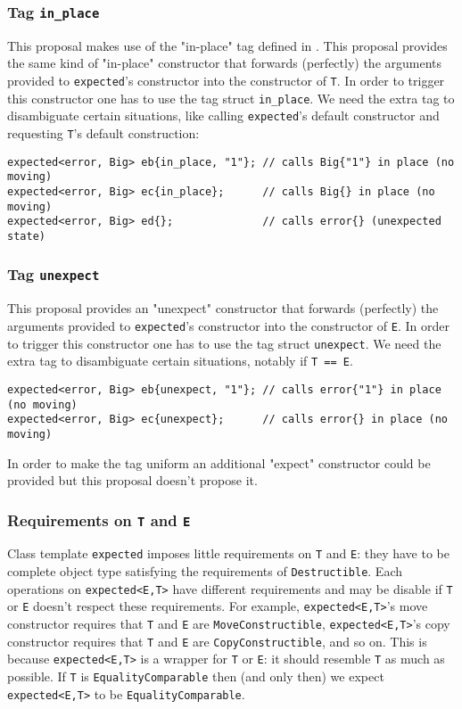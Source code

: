 \documentclass[a4paper,10pt]{article}
\newcommand{\cpp}[1]{\lstinline{#1}}
\begin{document}
\subsubsection{Tag \cpp{in_place}}

This proposal makes use of the "in-place" tag defined in \cite{OptionalRev5}. This proposal  provides the same kind of "in-place" constructor that forwards (perfectly) the arguments provided to \cpp{expected}'s constructor into the constructor of \cpp{T}. In order to trigger this constructor one has to use the tag struct \cpp{in_place}. We need the extra tag to disambiguate certain situations, like calling \cpp{expected}'s default constructor and requesting \cpp{T}'s default construction:

\begin{lstlisting}
expected<error, Big> eb{in_place, "1"}; // calls Big{"1"} in place (no moving)
expected<error, Big> ec{in_place};      // calls Big{} in place (no moving)
expected<error, Big> ed{};              // calls error{} (unexpected state)
\end{lstlisting}


\subsubsection{Tag \cpp{unexpect}}

This proposal provides an "unexpect" constructor that forwards (perfectly) the arguments provided to \cpp{expected}'s constructor into the constructor of \cpp{E}. In order to trigger this constructor one has to use the tag struct \cpp{unexpect}. We need the extra tag to disambiguate certain situations, notably if \cpp{T == E}.

\begin{lstlisting}
expected<error, Big> eb{unexpect, "1"}; // calls error{"1"} in place (no moving)
expected<error, Big> ec{unexpect};      // calls error{} in place (no moving)
\end{lstlisting}

In order to make the tag uniform an additional "expect" constructor could be provided but this proposal doesn't propose it.

\subsubsection{Requirements on \cpp{T} and \cpp{E}}

Class template \cpp{expected} imposes little requirements on \cpp{T} and \cpp{E}: they have to be  complete object type satisfying the requirements of \cpp{Destructible}. Each operations on \cpp{expected<E,T>} have different requirements and may be disable if \cpp{T} or \cpp{E} doesn't respect these requirements. For example, \cpp{expected<E,T>}'s move constructor requires that \cpp{T} and \cpp{E} are \cpp{MoveConstructible}, \cpp{expected<E,T>}'s copy constructor requires that \cpp{T} and \cpp{E} are \cpp{CopyConstructible}, and so on. This is because \cpp{expected<E,T>} is a wrapper for \cpp{T} or \cpp{E}: it should resemble \cpp{T} as much as possible. If \cpp{T} is \cpp{EqualityComparable} then (and only then) we expect \cpp{expected<E,T>} to be \cpp{EqualityComparable}. 
\end{document}
